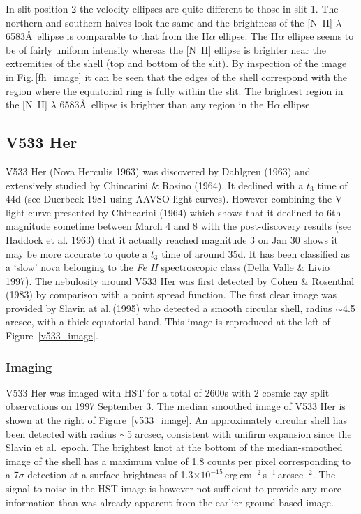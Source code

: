 In slit position 2 the velocity ellipses are quite different to those
in slit 1. The northern and southern halves look the same and the
brightness of the [N~II] $\lambda$ 6583\AA~ellipse is comparable to
that from the H$\alpha$ ellipse. The H$\alpha$ ellipse seems to be of
fairly uniform intensity whereas the [N~II] ellipse is brighter near
the extremities of the shell (top and bottom of the slit). By
inspection of the image in Fig.\,\ref{fh_image} it can be seen that
the edges of the shell correspond with the region where the equatorial
ring is fully within the slit. The brightest region in the [N~II]
$\lambda$ 6583\AA~ellipse is brighter than any region in the H$\alpha$
ellipse.

\subsection{V533 Her}
V533 Her (Nova Herculis 1963) was discovered by Dahlgren (1963) and
extensively studied by Chincarini \& Rosino (1964).  It declined with
a $t_3$ time of 44d (see Duerbeck 1981 using AAVSO light curves). 
However combining
the V light curve presented by Chincarini (1964) which shows that it
declined to 6th magnitude sometime between March 4 and 8 with the
post-discovery results (see Haddock et al. 1963) that it actually
reached magnitude 3 on Jan 30 shows it may be more accurate to quote a
$t_3$ time of around 35d.  It has been classified as a `slow' nova
belonging to the {\it Fe II} spectroscopic class (Della Valle \& Livio
1997). The nebulosity around V533 Her was first detected by Cohen \&
Rosenthal (1983) by comparison with a point spread function. The first
clear image was provided by Slavin at al.\,(1995) who detected a
smooth circular shell, radius $\sim$4.5 arcsec, with a thick
equatorial band. This image is reproduced at the left of
Figure~\ref{v533_image}.

\subsubsection{Imaging}
V533 Her was imaged with HST for a total of 2600s with 2 cosmic ray split
observations on 1997 September 3. The median smoothed image of V533 Her
is shown at the right of Figure~\ref{v533_image}. An approximately
circular shell has been detected with radius $\sim$5 arcsec, consistent
with unifirm expansion since the Slavin et al.\ epoch. The
brightest knot at the bottom of the median-smoothed image of the shell
has a maximum value of 1.8 counts per pixel corresponding to a 7$\sigma$ 
detection at a surface brightness of 1.3$\times
10^{-15}$\,erg\,cm$^{-2}$\,s$^{-1}$\,arcsec$^{-2}$.
The signal to
noise in the HST image is however not sufficient to provide any more
information than was already apparent from the earlier ground-based
image.

